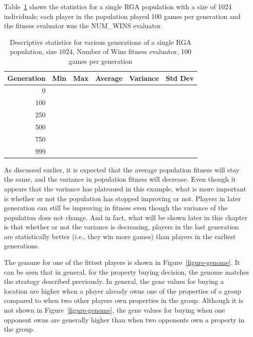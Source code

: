 Table~\ref{table-stats-for-s1024-n100-nw} shows the statistics for a single
RGA population with a size of 1024 individuals; each player in the population
played 100 games per generation and the fitness evaluator was the NUM\_WINS
evaluator.

\begin{table}[ht]
\begin{center}
\begin{tabular}{ | r || r | r | r | r | r |}
\hline                        
Generation & Min & Max & Average & Variance & Std Dev \\ \hline \hline
0   & & & & & \\ \hline
100 & & & & & \\ \hline 
250 & & & & & \\ \hline
500 & & & & & \\ \hline
750 & & & & & \\ \hline
999 & & & & & \\ \hline
\end{tabular}
\caption{Descriptive statistics for various generations of a single RGA
population, size 1024, Number of Wins fitness evaluator, 100 games per generation}
\label{table-stats-for-s1024-n100-nw}
\end{center}
\end{table}

As discussed earlier, it is expected that the average population fitness will
stay the same, and the variance in population fitness will decrease. Even though
it appears that the variance has plateaued in this example, what is more
important is whether or not the population has stopped improving or not. Players
in later generation can still be improving in fitness even though the variance
of the population does not change. And in fact, what will be shown later in this
chapter is that whether or not the variance is decreasing, players in the last
generation are statistically better (i.e., they win more games) than players in
the earliest generations.

The genome for one of the fittest players is shown in
Figure~\ref{figure-genome}. It can be seen that in general, for the property
buying decision, the genome matches the strategy described previously. In
general, the gene values for buying a location are higher when a player already
owns one of the properties of a group compared to when two other players own
properties in the group. Although it is not shown in Figure~\ref{figure-genome},
the gene values for buying when one opponent owns are generally higher than when
two opponents own a property in the group.

